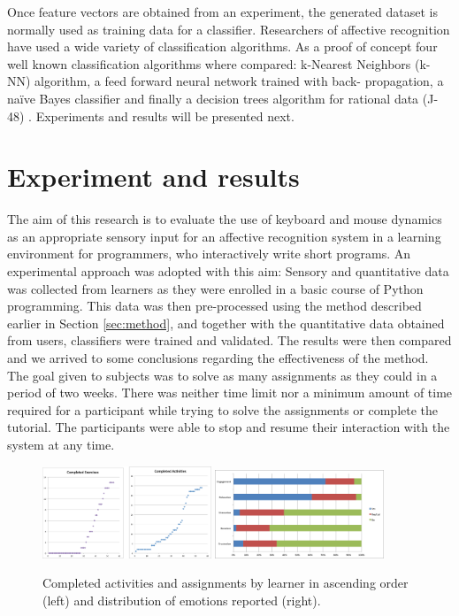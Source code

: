 \documentclass[a4paper,twoside]{article}
\begin{document}
Once feature vectors are obtained from an experiment, the generated dataset is
normally used as training data for a classifier. Researchers of affective
recognition have used a wide variety of classification algorithms. As a proof of
concept four well known classification algorithms where compared: k-Nearest
Neighbors (k-NN) algorithm, a feed forward neural network trained with back-
propagation, a na\"ive Bayes classifier and finally a decision trees algorithm for
rational data (J-48) \cite{tan2006introduction}. Experiments and results will be presented next.

\section{Experiment and results}
\label{sec:exp}
The aim of this research is to evaluate the use of keyboard
and mouse dynamics as an appropriate sensory input for an affective recognition
system in a learning environment for programmers,
who interactively write short programs. An experimental approach was adopted with this aim: Sensory and
quantitative data was collected from learners as they were enrolled in a basic
course of Python programming. This data was then pre-processed using the method
described earlier in Section \ref{sec:method}, and together with the quantitative data obtained from users,
classifiers were trained and validated. The results were then compared
and we arrived to some conclusions regarding the effectiveness of the method. The goal given to
subjects was to solve as many assignments as they could in a period of two weeks.
There was neither time limit nor a minimum amount of time required for a
participant while trying to solve the assignments or complete the tutorial. The
participants were able to stop and resume their interaction with the system at
any time.
%
\begin{figure}[!t]
\centering
\includegraphics[width=0.45\textwidth]{Completed.png}
\includegraphics[width=0.45\textwidth]{classDist.png}
\caption{Completed activities and assignments by learner in ascending order (left) and distribution of emotions reported (right).}
\label{fig_completed}
\end{figure}
\end{document}
